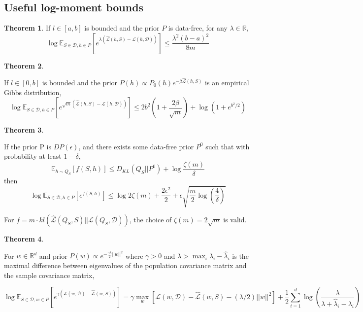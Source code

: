 \documentclass{article}
\theoremstyle{definition}
\newtheorem{theorem}{Theorem}[section]
\newcommand{\Expect}[2]{\mathbb{E}_{#1}\left [#2 \right ]}
\begin{document}
\subsection{Useful log-moment bounds} \label{append:log-moment-stuff}
\begin{theorem}
	If $l\in[a,b]$ is bounded and the prior $P$ is data-free, for any $\lambda\in \mathbb{R}$,
	$$\log \Expect{S\in \mathcal{D}, h\in P}{e^{\lambda(\hat{\mathcal{L}}(h,S)-\mathcal{L}(h,\mathcal{D}))}} \leq \frac{\lambda^2(b-a)^2}{8m}$$
\end{theorem}

\begin{theorem} \citep{Rivasplata2020}
	
	If $l\in[0,b]$ is bounded and the prior $P(h)\propto P_0(h)e^{-\beta\hat{\mathcal{L}}(h,S)}$ is an empirical Gibbs distribution, 
	$$\log \Expect{S\in \mathcal{D}, h\in P}{e^{\sqrt{m}(\hat{\mathcal{L}}(h,S)-\mathcal{L}(h,\mathcal{D}))}} \leq 2b^2(1+\frac{2\beta}{\sqrt{m}})+\log(1+e^{b^2/2})$$
\end{theorem}

\begin{theorem} \citep{Rivasplata2020, Dziugaite2018}
	
	If the prior P is $DP(\epsilon)$, and there exists some data-free prior $P^0$ such that with probability at least $1-\delta$,
	$$\Expect{h\sim Q_S}{f(S,h)} \leq D_{KL}(Q_S||P^0)+\log\frac{\zeta(m)}{\delta}$$
	then 
	$$\log \Expect{S\in \mathcal{D}, h\in P}{e^{f(S,h)}} \leq \log 2\zeta(m) + \frac{2\epsilon^2}{2}+\epsilon\sqrt{\frac{m}{2}\log(\frac{4}{\delta})}$$
	
	For $f=m\cdot kl(\hat{\mathcal{L}}(Q_S,S)||\mathcal{L}(Q_S,\mathcal{D}))$, the choice of $\zeta(m)=2\sqrt{m}$ is valid.
\end{theorem}

\begin{theorem} \citep{Rivasplata2020}
	
	For $w\in\mathbb{R}^d$ and prior $P(w)\propto e^{-\frac{\gamma\lambda}{2}||w||^2}$ where $\gamma>0$ and $\lambda>\max_i{\lambda_i-\hat{\lambda}_i}$ is the maximal difference between eigenvalues of the population covariance matrix and the sample covariance matrix,
	
	$$\log \Expect{S\in \mathcal{D}, w\in P}{e^{\gamma(\mathcal{L}(w,\mathcal{D})-\hat{\mathcal{L}}(w,S))}} = \gamma\max_w{\left [\mathcal{L}(w,\mathcal{D})-\hat{\mathcal{L}}(w,S)-(\lambda/2)||w||^2\right ]} + \frac{1}{2}\sum_{i=1}^{d}\log\left (\frac{\lambda}{\lambda+\hat{\lambda}_i-\lambda_i} \right ) $$
\end{theorem}
\end{document}
